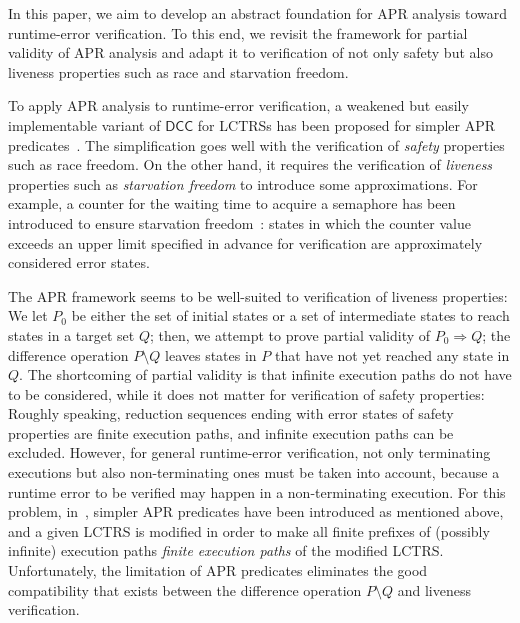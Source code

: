 \documentclass[10pt,a4paper]{article}
\newcommand{\ReachPred}[2]{#1 \Rightarrow #2}
\newcommand{\DCC}[1][]{\mathsf{DCC}}
\begin{document}
In this paper, we aim to develop an abstract foundation for APR analysis toward runtime-error verification.
To this end, we revisit the framework for partial validity of APR analysis and adapt it to verification of not only safety but also liveness properties such as race and starvation freedom.

To apply APR analysis to runtime-error verification, a weakened but easily implementable variant of $\DCC$ for LCTRSs has been proposed for simpler APR predicates~\cite{KN23jlamp}.
The simplification goes well with the verification of \emph{safety} properties such as race freedom.
On the other hand, it requires the verification of \emph{liveness} properties such as \emph{starvation freedom} to introduce some approximations.
For example, a counter for the waiting time to acquire a semaphore has been introduced to ensure starvation freedom~\cite{KN23padl}:
states in which the counter value exceeds an upper limit specified in advance for verification are approximately considered error states.

The APR framework seems to be well-suited to verification of liveness properties:
We let $P_0$ be either the set of initial states or a set of intermediate states to reach states in a target set $Q$;
then, we attempt to prove partial validity of $\ReachPred{P_0}{Q}$;
the difference operation $P \setminus Q$ leaves states in $P$ that have not yet reached any state in $Q$.
The shortcoming of partial validity is that infinite execution paths do not have to be considered, while it does not matter for verification of safety properties:
Roughly speaking, reduction sequences ending with error states of safety properties are finite execution paths, and infinite execution paths can be excluded.
However, for general runtime-error verification, not only terminating executions but also non-terminating ones must be taken into account, because a runtime error to be verified may happen in a non-terminating execution.
For this problem, in~\cite{KN23jlamp}, simpler APR predicates have been introduced as mentioned above, and a given LCTRS is modified in order to make all finite prefixes of (possibly infinite) execution paths \emph{finite execution paths} of the modified LCTRS.
Unfortunately, the limitation of APR predicates eliminates the good compatibility that exists between the difference operation $P \setminus Q$ and liveness verification.
\end{document}

